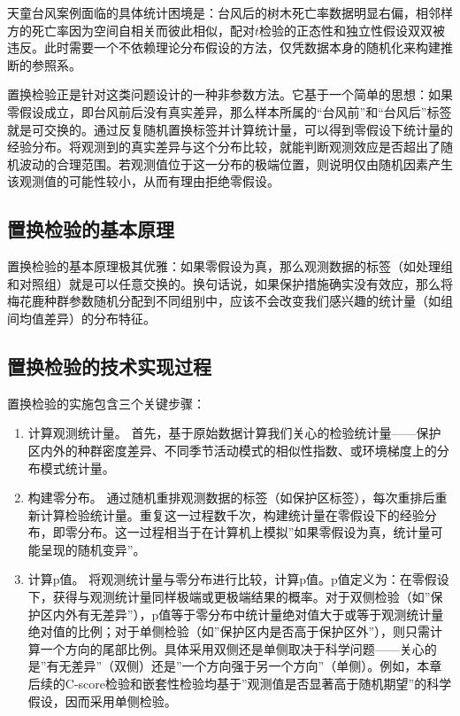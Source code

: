 \documentclass[
  twoside,12pt,fontset=none]{ctexbook}
\begin{document}
天童台风案例面临的具体统计困境是：台风后的树木死亡率数据明显右偏，相邻样方的死亡率因为空间自相关而彼此相似，配对\(t\)检验的正态性和独立性假设双双被违反。此时需要一个不依赖理论分布假设的方法，仅凭数据本身的随机化来构建推断的参照系。

置换检验正是针对这类问题设计的一种非参数方法。它基于一个简单的思想：如果零假设成立，即台风前后没有真实差异，那么样本所属的``台风前''和``台风后''标签就是可交换的。通过反复随机置换标签并计算统计量，可以得到零假设下统计量的经验分布。将观测到的真实差异与这个分布比较，就能判断观测效应是否超出了随机波动的合理范围。若观测值位于这一分布的极端位置，则说明仅由随机因素产生该观测值的可能性较小，从而有理由拒绝零假设。

\hypertarget{ux7f6eux6362ux68c0ux9a8cux7684ux57faux672cux539fux7406}{%
\subsection{置换检验的基本原理}\label{ux7f6eux6362ux68c0ux9a8cux7684ux57faux672cux539fux7406}}

置换检验的基本原理极其优雅：如果零假设为真，那么观测数据的标签（如处理组和对照组）就是可以任意交换的。换句话说，如果保护措施确实没有效应，那么将梅花鹿种群参数随机分配到不同组别中，应该不会改变我们感兴趣的统计量（如组间均值差异）的分布特征。

\hypertarget{ux7f6eux6362ux68c0ux9a8cux7684ux6280ux672fux5b9eux73b0ux8fc7ux7a0b}{%
\subsection{置换检验的技术实现过程}\label{ux7f6eux6362ux68c0ux9a8cux7684ux6280ux672fux5b9eux73b0ux8fc7ux7a0b}}

置换检验的实施包含三个关键步骤：

\begin{enumerate}
\def\labelenumi{\arabic{enumi}.}
\item
  计算观测统计量。
  首先，基于原始数据计算我们关心的检验统计量------保护区内外的种群密度差异、不同季节活动模式的相似性指数、或环境梯度上的分布模式统计量。
\item
  构建零分布。
  通过随机重排观测数据的标签（如保护区标签），每次重排后重新计算检验统计量。重复这一过程数千次，构建统计量在零假设下的经验分布，即零分布。这一过程相当于在计算机上模拟''如果零假设为真，统计量可能呈现的随机变异''。
\item
  计算p值。
  将观测统计量与零分布进行比较，计算p值。p值定义为：在零假设下，获得与观测统计量同样极端或更极端结果的概率。对于双侧检验（如''保护区内外有无差异''），p值等于零分布中统计量绝对值大于或等于观测统计量绝对值的比例；对于单侧检验（如''保护区内是否高于保护区外''），则只需计算一个方向的尾部比例。具体采用双侧还是单侧取决于科学问题------关心的是''有无差异''（双侧）还是''一个方向强于另一个方向''（单侧）。例如，本章后续的C-score检验和嵌套性检验均基于''观测值是否显著高于随机期望''的科学假设，因而采用单侧检验。
\end{enumerate}
\end{document}
